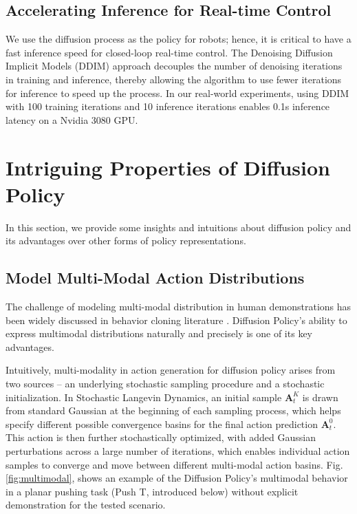 \documentclass[Afour,sageh,times]{sagej}
\begin{document}
\subsection{Accelerating Inference for Real-time Control}
We use the diffusion process as the policy for robots; hence, it is critical to have a fast inference speed for closed-loop real-time control. The Denoising Diffusion Implicit Models (DDIM) approach \cite{song2021ddim}  decouples the number of denoising iterations in training and inference, thereby allowing the algorithm to use fewer iterations for inference to speed up the process. In our real-world experiments, using DDIM with 100 training iterations and 10 inference iterations enables 0.1s inference latency on a Nvidia 3080 GPU.

\section{Intriguing Properties of Diffusion Policy}
In this section, we provide some insights and intuitions about diffusion policy and its advantages over other forms of policy representations.



\subsection{Model Multi-Modal Action Distributions}
\label{sec:multimodal}
The challenge of modeling multi-modal distribution in human demonstrations has been widely discussed in behavior cloning literature \cite{ibc,bet,robomimic}. Diffusion Policy's ability to express multimodal distributions naturally and precisely is one of its key advantages.


Intuitively, multi-modality in action generation for diffusion policy arises from two sources -- an underlying stochastic sampling procedure and a stochastic initialization. In Stochastic Langevin Dynamics, an initial sample $\mathbf{A}^K_t$ is drawn from standard Gaussian at the beginning of each sampling process, which helps specify different possible convergence basins for the final action prediction $\mathbf{A}^0_t$. This action is then further stochastically optimized, with added Gaussian perturbations across a large number of iterations, which enables individual action samples to converge and move between different multi-modal action basins.
Fig. \ref{fig:multimodal}, shows an example of the Diffusion Policy's multimodal behavior in a planar pushing task (Push T, introduced below) without explicit demonstration for the tested scenario.
\end{document}
